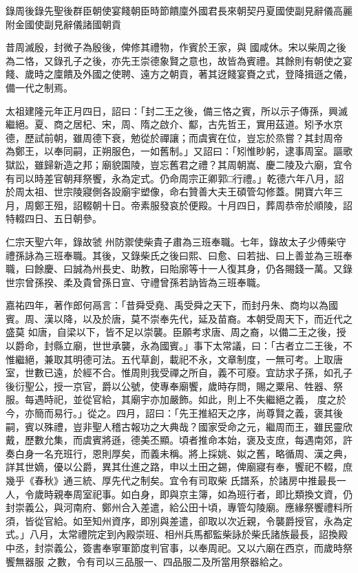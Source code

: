 
\begin{pinyinscope}

 錄周後錄先聖後群臣朝使宴餞朝臣時節饋廩外國君長來朝契丹夏國使副見辭儀高麗附金國使副見辭儀諸國朝貢



 昔周滅殷，封微子為殷後，俾修其禮物，作賓於王家，與
 國咸休。宋以柴周之後為二恪，又錄孔子之後，亦先王崇德象賢之意也，故皆為賓禮。其餘則有朝使之宴餞、歲時之廩饋及外國之使聘、遠方之朝貢，著其迓餞宴賚之式，登降揖遜之儀，備一代之制焉。



 太祖建隆元年正月四日，詔曰：「封二王之後，備三恪之賓，所以示子傳孫，興滅繼絕。夏、商之居杞、宋，周、隋之啟介、酅，古先哲王，實用茲道。矧予水京德，歷試前朝，雖周德下衰，勉從於禪讓；而虞賓在位，豈忘於烝嘗？其封周帝
 為鄭王，以奉同嗣，正朔服色，一如舊制。」又詔曰：「矧惟眇躬，逮事周室。謳歌獄訟，雖歸新造之邦；廟貌園陵，豈忘舊君之禮？其周朝嵩、慶二陵及六廟，宜令有司以時差官朝拜祭饗，永為定式。仍命周宗正卿郭□行禮。」乾德六年八月，詔於周太祖、世宗陵寢側各設廟宇塑像，命右贊善大夫王碩管勾修蓋。開寶六年三月，周鄭王殂，詔輟朝十日。帝素服發哀於便殿。十月四日，葬周恭帝於順陵，詔特輟四日、五日朝參。



 仁宗天聖六年，錄故虢
 州防禦使柴貴子肅為三班奉職。七年，錄故太子少傅柴守禮孫詠為三班奉職。其後，又錄柴氏之後曰熙、曰愈、曰若拙、曰上善並為三班奉職，曰餘慶、曰誠為州長史、助教，曰貽廓等十一人復其身，仍各賜錢一萬。又錄世宗曾孫揆、柔及貴曾孫日宣、守禮曾孫若訥皆為三班奉職。



 嘉祐四年，著作郎何鬲言：「昔舜受堯、禹受舜之天下，而封丹朱、商均以為國賓。周、漢以降，以及於唐，莫不崇奉先代，延及苗裔。本朝受周天下，而近代之盛莫
 如唐，自梁以下，皆不足以崇襲。臣願考求唐、周之裔，以備二王之後，授以爵命，封縣立廟，世世承襲，永為國賓。」事下太常議，曰：「古者立二王後，不惟繼絕，兼取其明德可法。五代草創，載祀不永，文章制度，一無可考。上取唐室，世數已遠，於經不合。惟周則我受禪之所自，義不可廢。宜訪求子孫，如孔子後衍聖公，授一京官，爵以公號，使專奉廟饗，歲時存問，賜之粟帛、牲器、祭服。每遇時祀，並從官給，其廟宇亦加嚴飾。如此，則上不失繼絕之義，
 度之於今，亦簡而易行。」從之。四月，詔曰：「先王推紹天之序，尚尊賢之義，褒其後嗣，賓以殊禮，豈非聖人稽古報功之大典哉？國家受命之元，繼周而王，雖民靈欣戴，歷數允集，而虞賓將遜，德美丕顯。頃者推命本始，褒及支庶，每遇南郊，許奏白身一名充班行，恩則厚矣，而義未稱。將上採姚、姒之舊，略循周、漢之典，詳其世嫡，優以公爵，異其仕進之路，申以土田之錫，俾廟寢有奉，饗祀不輟，庶幾乎《春秋》通三統、厚先代之制矣。宜令有司取柴
 氏譜系，於諸房中推最長一人，令歲時親奉周室祀事。如白身，即與京主簿，如為班行者，即比類換文資，仍封崇義公，與河南府、鄭州合入差遣，給公田十頃，專管勾陵廟。應緣祭饗禮料所須，皆從官給。如至知州資序，即別與差遣，卻取以次近親，令襲爵授官，永為定式。」八月，太常禮院定到內殿崇班、相州兵馬都監柴詠於柴氏諸族最長，詔換殿中丞，封崇義公，簽書奉寧軍節度判官事，以奉周祀。又以六廟在西京，而歲時祭饗無器服
 之數，令有司以三品服一、四品服二及所當用祭器給之。




\end{pinyinscope}
